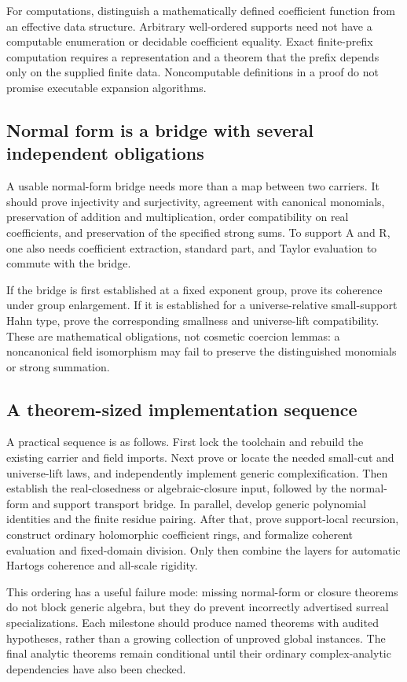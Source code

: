 \documentclass[11pt,letterpaper]{article}
\numberwithin{equation}{section}
\theoremstyle{definition}
\theoremstyle{remark}
\begin{document}
For computations, distinguish a mathematically defined coefficient function from an effective data structure. Arbitrary well-ordered supports need not have a computable enumeration or decidable coefficient equality. Exact finite-prefix computation requires a representation and a theorem that the prefix depends only on the supplied finite data. Noncomputable definitions in a proof do not promise executable expansion algorithms.

\subsection{Normal form is a bridge with several independent obligations}
A usable normal-form bridge needs more than a map between two carriers. It should prove injectivity and surjectivity, agreement with canonical monomials, preservation of addition and multiplication, order compatibility on real coefficients, and preservation of the specified strong sums. To support A and R, one also needs coefficient extraction, standard part, and Taylor evaluation to commute with the bridge.

If the bridge is first established at a fixed exponent group, prove its coherence under group enlargement. If it is established for a universe-relative small-support Hahn type, prove the corresponding smallness and universe-lift compatibility. These are mathematical obligations, not cosmetic coercion lemmas: a noncanonical field isomorphism may fail to preserve the distinguished monomials or strong summation.

\subsection{A theorem-sized implementation sequence}
A practical sequence is as follows. First lock the toolchain and rebuild the existing carrier and field imports. Next prove or locate the needed small-cut and universe-lift laws, and independently implement generic complexification. Then establish the real-closedness or algebraic-closure input, followed by the normal-form and support transport bridge. In parallel, develop generic polynomial identities and the finite residue pairing. After that, prove support-local recursion, construct ordinary holomorphic coefficient rings, and formalize coherent evaluation and fixed-domain division. Only then combine the layers for automatic Hartogs coherence and all-scale rigidity.

This ordering has a useful failure mode: missing normal-form or closure theorems do not block generic algebra, but they do prevent incorrectly advertised surreal specializations. Each milestone should produce named theorems with audited hypotheses, rather than a growing collection of unproved global instances. The final analytic theorems remain conditional until their ordinary complex-analytic dependencies have also been checked.
\end{document}
